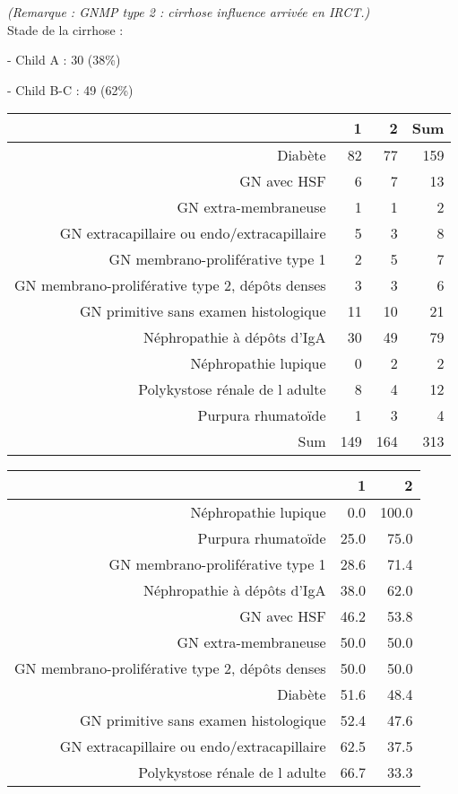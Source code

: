 \documentclass[11pt,a4paper]{article}\usepackage[]{graphicx}\usepackage[]{color}
\begin{document}
\textit{(Remarque : GNMP type 2 : cirrhose influence arrivée en IRCT.)}
~\\

Stade de la cirrhose :

- Child A : 30 (38\%)

- Child B-C : 49 (62\%)

\begin{table}[H]
\centering
\begin{tabular}{rrrr}
  \hline
 & 1 & 2 & Sum \\ 
  \hline
Diabète & 82 & 77 & 159 \\ 
  GN avec HSF & 6 & 7 & 13 \\ 
  GN extra-membraneuse & 1 & 1 & 2 \\ 
  GN extracapillaire ou endo/extracapillaire & 5 & 3 & 8 \\ 
  GN membrano-proliférative type 1 & 2 & 5 & 7 \\ 
  GN membrano-proliférative type 2, dépôts denses & 3 & 3 & 6 \\ 
  GN primitive sans examen histologique & 11 & 10 & 21 \\ 
  Néphropathie à dépôts d'IgA & 30 & 49 & 79 \\ 
  Néphropathie lupique & 0 & 2 & 2 \\ 
  Polykystose rénale de l adulte & 8 & 4 & 12 \\ 
  Purpura rhumatoïde & 1 & 3 & 4 \\ 
  Sum & 149 & 164 & 313 \\ 
   \hline
\end{tabular}
\end{table}
\begin{table}[H]
\centering
\begin{tabular}{rrr}
  \hline
 & 1 & 2 \\ 
  \hline
Néphropathie lupique & 0.0 & 100.0 \\ 
  Purpura rhumatoïde & 25.0 & 75.0 \\ 
  GN membrano-proliférative type 1 & 28.6 & 71.4 \\ 
  Néphropathie à dépôts d'IgA & 38.0 & 62.0 \\ 
  GN avec HSF & 46.2 & 53.8 \\ 
  GN extra-membraneuse & 50.0 & 50.0 \\ 
  GN membrano-proliférative type 2, dépôts denses & 50.0 & 50.0 \\ 
  Diabète & 51.6 & 48.4 \\ 
  GN primitive sans examen histologique & 52.4 & 47.6 \\ 
  GN extracapillaire ou endo/extracapillaire & 62.5 & 37.5 \\ 
  Polykystose rénale de l adulte & 66.7 & 33.3 \\ 
   \hline
\end{tabular}
\end{table}
\end{document}

